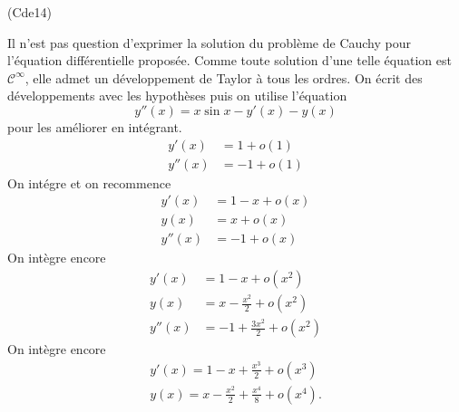 \begin{tiny}(Cde14)\end{tiny} Il n'est pas question d'exprimer la solution du problème de Cauchy pour l'équation différentielle proposée. Comme toute solution d'une telle équation est $\mathcal{C}^{\infty}$, elle admet un développement de Taylor à tous les ordres. On écrit des développements avec les hypothèses puis on utilise l'équation 
\[
  y''(x) = x\sin x - y'(x) - y(x)  
\]
pour les améliorer en intégrant.
\begin{align*}
 y'(x)   &= 1 + o(1) \\
 y''(x)  &= -1 + o(1)
\end{align*}
On intégre et on recommence
\begin{align*}
  y'(x)   &= 1 - x + o(x) \\
  y(x)    &= x +  o(x)\\
  y''(x)  &= -1 + o(x)
\end{align*}
On intègre encore
\begin{align*}
 y'(x)   &= 1 -x + o(x^2) \\
  y(x)   &= x  -\frac{x^2}{2} + o(x^2)\\
  y''(x) &= -1 + \frac{3x^2}{2} + o(x^2) 
\end{align*}
On intègre encore
\begin{align*}
  y'(x) = 1 -x + \frac{x^3}{2} + o(x^3) \\
  y(x) = x - \frac{x^2}{2} + \frac{x^4}{8} + o(x^4).
\end{align*}
